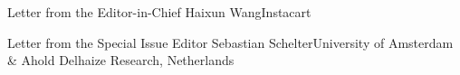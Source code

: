 \documentclass[11pt]{article}
\begin{document}


\begin{bulletin}


%
%

\begin{lettersection}


\begin{letter}{Letter from the Editor-in-Chief}
{Haixun Wang}{Instacart}

\end{letter}
%
\newpage
%
%
\begin{letter}{Letter from the Special Issue Editor} %
{Sebastian Schelter}{University of Amsterdam \& Ahold Delhaize Research, Netherlands}


\end{letter}

\end{lettersection}


%


\end{bulletin}
\end{document}
